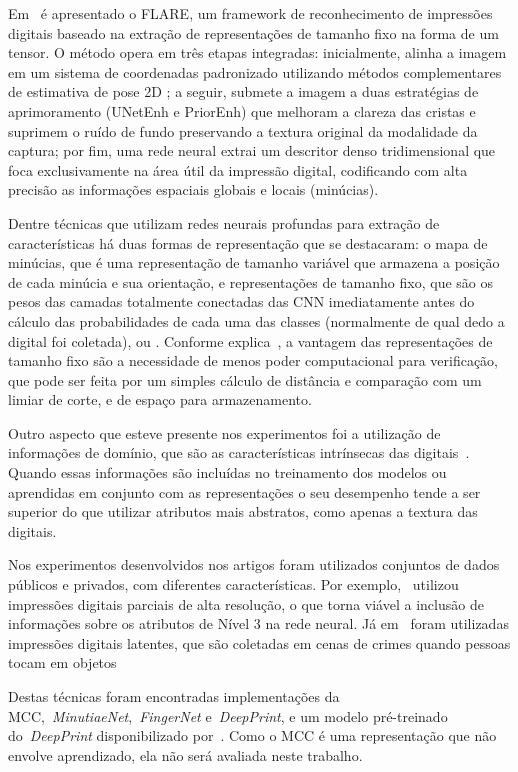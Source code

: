 Em~\cite{flare} é apresentado o FLARE, um framework de reconhecimento de impressões digitais baseado na extração de representações de tamanho fixo na forma de um tensor. O método opera em três etapas integradas: inicialmente, alinha a imagem em um sistema de coordenadas padronizado utilizando métodos complementares de estimativa de pose 2D
; a seguir, submete a imagem a duas estratégias de aprimoramento (UNetEnh e PriorEnh) que melhoram a clareza das cristas e suprimem o ruído de fundo preservando a textura original da modalidade da captura; por fim, uma rede neural extrai um descritor denso tridimensional que foca exclusivamente na área útil da impressão digital, codificando com alta precisão as informações espaciais globais e locais (minúcias).

Dentre técnicas que utilizam redes neurais profundas para extração de características há duas formas de representação que se destacaram: o mapa de minúcias, que é uma representação de tamanho variável que armazena a posição de cada minúcia e sua orientação, e representações de tamanho fixo, que são os pesos das camadas totalmente conectadas das CNN imediatamente antes do cálculo das probabilidades de cada uma das classes (normalmente de qual dedo a digital foi coletada), ou . Conforme explica~, a vantagem das representações de tamanho fixo são a necessidade de menos poder computacional para verificação, que pode ser feita por um simples cálculo de distância e comparação com um limiar de corte, e de espaço para armazenamento.

Outro aspecto que esteve presente nos experimentos foi a utilização de informações de domínio, que são as características intrínsecas das digitais~\cite{handbook_of_fp_recognition}. Quando essas informações são incluídas no treinamento dos modelos ou aprendidas em conjunto com as representações o seu desempenho tende a ser superior do que utilizar atributos mais abstratos, como apenas a textura das digitais.

Nos experimentos desenvolvidos nos artigos foram utilizados conjuntos de dados públicos e privados, com diferentes características. Por exemplo,~ utilizou impressões digitais parciais de alta resolução, o que torna viável a inclusão de informações sobre os atributos de Nível 3 na rede neural. Já em~\cite{fcn} foram utilizadas impressões digitais latentes, que são coletadas em cenas de crimes quando pessoas tocam em objetos~\cite{handbook_of_fp_recognition}

Destas técnicas foram encontradas implementações da MCC,~\textit{MinutiaeNet},~\textit{FingerNet} e~\textit{DeepPrint}, e um modelo pré-treinado do~\textit{DeepPrint} disponibilizado por~. Como o MCC é uma representação que não envolve aprendizado, ela não será avaliada neste trabalho.